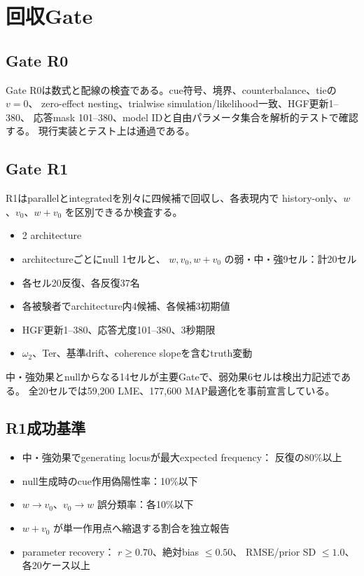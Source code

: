 \documentclass[11pt]{ltjsarticle}
\newcommand{\pass}{\textcolor{green!45!black}{通過}}
\begin{document}
\section{回収Gate}

\subsection{Gate R0}

Gate R0は数式と配線の検査である。cue符号、境界、counterbalance、tieの \(v=0\)、
zero-effect nesting、trialwise simulation/likelihood一致、HGF更新1--380、
応答mask 101--380、model IDと自由パラメータ集合を解析的テストで確認する。
現行実装とテスト上は\pass である。

\subsection{Gate R1}

R1はparallelとintegratedを別々に四候補で回収し、各表現内で
history-only、\(w\)、\(v_0\)、\(w+v_0\) を区別できるか検査する。

\begin{itemize}
  \item 2 architecture
  \item architectureごとにnull 1セルと、
        \(w,v_0,w+v_0\) の弱・中・強9セル：計20セル
  \item 各セル20反復、各反復37名
  \item 各被験者でarchitecture内4候補、各候補3初期値
  \item HGF更新1--380、応答尤度101--380、3秒期限
  \item \(\omega_2\)、Ter、基準drift、coherence slopeを含むtruth変動
\end{itemize}

中・強効果とnullからなる14セルが主要Gateで、弱効果6セルは検出力記述である。
全20セルでは59,200 LME、177,600 MAP最適化を事前宣言している。

\subsection{R1成功基準}

\begin{itemize}
  \item 中・強効果でgenerating locusが最大expected frequency：
        反復の80\%以上
  \item null生成時のcue作用偽陽性率：10\%以下
  \item \(w\rightarrow v_0\)、\(v_0\rightarrow w\) 誤分類率：各10\%以下
  \item \(w+v_0\) が単一作用点へ縮退する割合を独立報告
  \item parameter recovery：
        \(r\ge0.70\)、絶対bias \(\le0.50\)、
        RMSE/prior SD \(\le1.0\)、各20ケース以上
\end{itemize}
\end{document}
